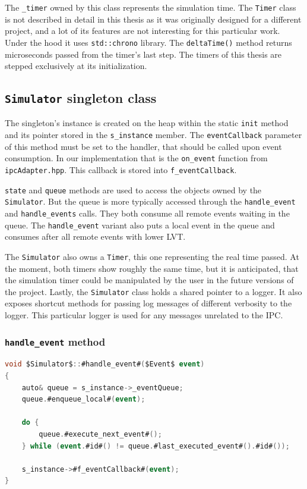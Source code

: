 The \texttt{\_timer} owned by this class represents the simulation time. The \texttt{Timer} class is not described in detail in this thesis as it was originally designed for a different project, and a lot of its features are not interesting for this particular work. Under the hood it uses \texttt{std::chrono} library. The \texttt{deltaTime()} method returns microseconds passed from the timer's last step. The timers of this thesis are stepped exclusively at its initialization.

\subsection{\texttt{Simulator} singleton class}

The singleton's instance is created on the heap within the static \texttt{init} method and its pointer stored in the \texttt{s\_instance} member. The \texttt{eventCallback} parameter of this method must be set to the handler, that should be called upon event consumption. In our implementation that is the \texttt{on\_event} function from \texttt{ipcAdapter.hpp}. This callback is stored into \texttt{f\_eventCallback}.

\texttt{state} and \texttt{queue} methods are used to access the objects owned by the \texttt{Simulator}. But the queue is more typically accessed through the \texttt{handle\_event} and \texttt{handle\_events} calls. They both consume all remote events waiting in the queue. The \texttt{handle\_event} variant also puts a local event in the queue and consumes after all remote events with lower LVT.

The \texttt{Simulator} also owns a \texttt{Timer}, this one representing the real time passed. At the moment, both timers show roughly the same time, but it is anticipated, that the simulation timer could be manipulated by the user in the future versions of the project. Lastly, the \texttt{Simulator} class holds a shared pointer to a logger. It also exposes shortcut methods for passing log messages of different verbosity to the logger. This particular logger is used for any messages unrelated to the IPC.

\subsubsection{\texttt{handle\_event} method} \label{sssec:handle-event}

\begin{lstlisting}[language=csharp, caption={\texttt{Simulator::handle\_event} method}]
void $Simulator$::#handle_event#($Event$ event)
{
    auto& queue = s_instance->_eventQueue;
    queue.#enqueue_local#(event);

    do {
        queue.#execute_next_event#();
    } while (event.#id#() != queue.#last_executed_event#().#id#());

    s_instance->#f_eventCallback#(event);
}
\end{lstlisting}

